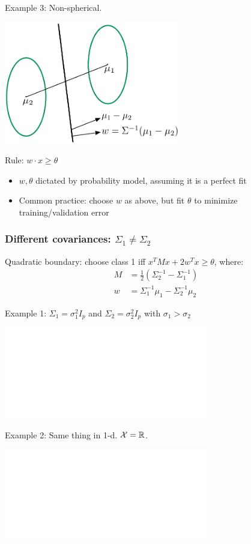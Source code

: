 \documentclass[smaller,handout]{beamer}
\def\X{{\cal X}}
\def\R{{\mathbb R}}
\def\darkred{\color{red!70!black}}
\def\vone{{\vskip.1in}}
\def\R{{\mathbb R}}
\begin{document}
%

\begin{frame}

{\darkred Example 3: Non-spherical.}

\begin{center}
\includegraphics[width=3in]{discriminant4.pdf}
\end{center}

\pause\vone
\alert{Rule: $w \cdot x \geq \theta$}
\begin{itemize}
\item $w,\theta$ dictated by probability model, assuming it is a perfect fit
\item Common practice: choose $w$ as above, but fit $\theta$ to minimize training/validation error
\end{itemize}

\end{frame}

\begin{frame}
\frametitle{Different covariances: $\Sigma_1 \neq \Sigma_2$}

\alert{Quadratic boundary: choose class 1 iff 
$x^T M x + 2 w^T x \geq \theta$, where:
\begin{align*}
M &= \frac{1}{2}(\Sigma_2^{-1} - \Sigma_1^{-1}) \\
w &= \Sigma_1^{-1} \mu_1 - \Sigma_2^{-1} \mu_2 
\end{align*}}

{\darkred Example 1: $\Sigma_1 = \sigma_1^2 I_p$ and $\Sigma_2 = \sigma_2^2 I_p$ with $\sigma_1 > \sigma_2$}

\begin{center}
\includegraphics<2->[width=3.5in]{discriminant5.pdf}
\end{center}

\end{frame}
%

\begin{frame}

{\darkred Example 2: Same thing in 1-d. $\X = \R$.}

\begin{center}
\includegraphics<2->[width=3.5in]{discriminant7.pdf}
\end{center}

\end{frame}
\end{document}
